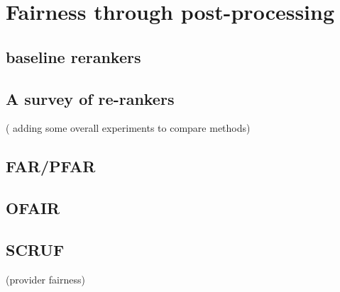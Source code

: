 \chapter{Fairness through post-processing}
\label{fairness_postproc}

\section{baseline rerankers}
\section{A survey of re-rankers} ( adding some overall experiments to compare methods)
\section{FAR/PFAR}
\section{OFAIR}
\section{SCRUF}
    (provider fairness)